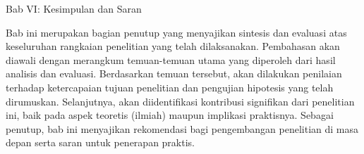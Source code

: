 \documentclass[12pt,a4paper]{article}
\begin{document}
Bab VI: Kesimpulan dan Saran

Bab ini merupakan bagian penutup yang menyajikan sintesis dan evaluasi atas keseluruhan rangkaian penelitian yang telah dilaksanakan. Pembahasan akan diawali dengan merangkum temuan-temuan utama yang diperoleh dari hasil analisis dan evaluasi. Berdasarkan temuan tersebut, akan dilakukan penilaian terhadap ketercapaian tujuan penelitian dan pengujian hipotesis yang telah dirumuskan. Selanjutnya, akan diidentifikasi kontribusi signifikan dari penelitian ini, baik pada aspek teoretis (ilmiah) maupun implikasi praktisnya. Sebagai penutup, bab ini menyajikan rekomendasi bagi pengembangan penelitian di masa depan serta saran untuk penerapan praktis.


\end{document}
